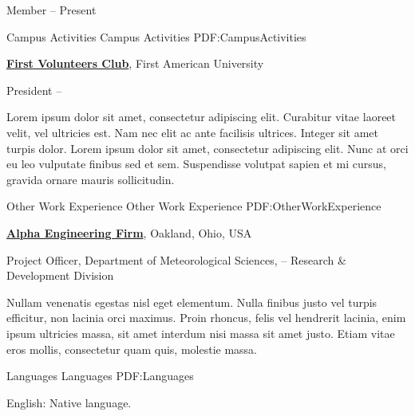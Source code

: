 \documentclass[letterpaper,MMMyyyy,nonstopmode]{simpleresumecv}
\begin{document}
\begin{Body}
{\Gap
\BulletItem
Member
\hfill
{} --
Present

\newpage


\Section
{Campus Activities}
{Campus Activities}
{PDF:CampusActivities}

\Entry
\href{http://www.example.com/my-club}
{\textbf{First Volunteers Club}},
First American University

\Gap
\BulletItem
President
\hfill
{} --
\begin{Detail}
\SubBulletItem
Lorem ipsum dolor sit amet, consectetur adipiscing elit.
\SubBulletItem
Curabitur vitae laoreet velit, vel ultricies est. Nam nec elit ac ante facilisis ultrices.
\SubBulletItem
Integer sit amet turpis dolor. Lorem ipsum dolor sit amet, consectetur adipiscing elit. Nunc at orci eu leo vulputate finibus sed et sem.
\SubBulletItem
Suspendisse volutpat sapien et mi cursus, gravida ornare mauris sollicitudin.
\end{Detail}


\Section
{Other Work\newline
Experience}
{Other Work Experience}
{PDF:OtherWorkExperience}

\Entry
\href{http://www.example.com/my-company}
{\textbf{Alpha Engineering Firm}},
Oakland, Ohio, USA

\Gap
\BulletItem
Project Officer,
Department of Meteorological Sciences,
\hfill
{} --
\newline
Research \& Development Division
\begin{Detail}
\SubBulletItem
Nullam venenatis egestas nisl eget elementum.
\SubBulletItem
Nulla finibus justo vel turpis efficitur, non lacinia orci maximus. Proin rhoncus, felis vel hendrerit lacinia, enim ipsum ultricies massa, sit amet interdum nisi massa sit amet justo.
\SubBulletItem
Etiam vitae eros mollis, consectetur quam quis, molestie massa.
\end{Detail}


\Section
{Languages}
{Languages}
{PDF:Languages}

\BulletItem
English: Native language.

}
\end{Body}
\end{document}
